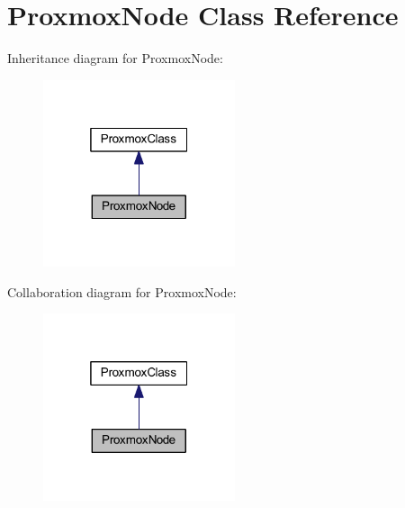 \hypertarget{class_proxmox_node}{}\section{Proxmox\+Node Class Reference}
\label{class_proxmox_node}


Inheritance diagram for Proxmox\+Node\+:
\nopagebreak
\begin{figure}[H]
\begin{center}
\leavevmode
\includegraphics[width=160pt]{class_proxmox_node__inherit__graph}
\end{center}
\end{figure}


Collaboration diagram for Proxmox\+Node\+:
\nopagebreak
\begin{figure}[H]
\begin{center}
\leavevmode
\includegraphics[width=160pt]{class_proxmox_node__coll__graph}
\end{center}
\end{figure}
